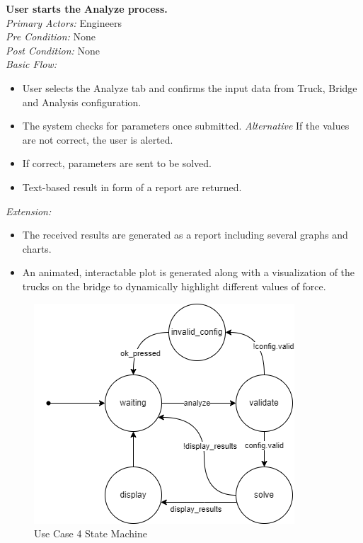 \documentclass[12pt]{article}
\begin{document}
\noindent
\textbf{User starts the Analyze process. } \\
\emph{  Primary Actors:} Engineers\\
\emph{  Pre Condition:} None\\
\emph{  Post Condition:} None\\ 
\emph{  Basic Flow:} 
\begin{itemize}
\item User selects the Analyze tab and confirms the input data from Truck, Bridge and Analysis configuration. 
\item The system checks for parameters once submitted.
\subitem \emph{Alternative} If the values are not correct, the user is alerted.
\item If correct, parameters are sent to be solved. 
\item Text-based result in form of a report are returned.
\end{itemize}
\emph{  Extension:} 
\begin{itemize}
\item The received results are generated as a report including several graphs and charts.
\item An animated, interactable plot is generated along with a visualization of the trucks on the bridge to dynamically highlight different values of force.
\end{itemize}
\begin{figure}[H]
  \centering
  \includegraphics[width=0.5\linewidth]{use-case-4-sm.png}
  \caption{Use Case 4 State Machine}
  \label {fig:use-case-4-sm}
\end{figure}
\end{document}
